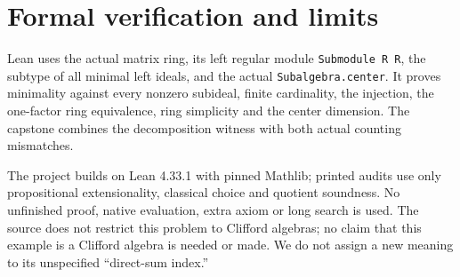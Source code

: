 \documentclass[10pt]{article}
\begin{document}
\section*{Formal verification and limits}
Lean uses the actual matrix ring, its left regular module
\texttt{Submodule R R}, the subtype of all minimal left ideals, and the
actual \texttt{Subalgebra.center}. It proves minimality against every
nonzero subideal, finite cardinality, the injection, the one-factor ring
equivalence, ring simplicity and the center dimension. The capstone
combines the decomposition witness with both actual counting mismatches.

The project builds on Lean 4.33.1 with pinned Mathlib; printed audits use
only propositional extensionality, classical choice and quotient soundness.
No unfinished proof, native evaluation, extra axiom or long search is used.
The source does not restrict this problem to Clifford algebras; no claim
that this example is a Clifford algebra is needed or made. We do not
assign a new meaning to its unspecified ``direct-sum index.''
\end{document}
